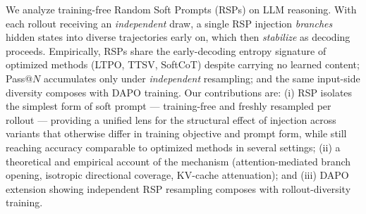 We analyze training-free Random Soft Prompts (RSPs) on LLM reasoning. With each rollout receiving an \emph{independent} draw, a single RSP injection \emph{branches} hidden states into diverse trajectories early on, which then \emph{stabilize} as decoding proceeds. Empirically, RSPs share the early-decoding entropy signature of optimized methods (LTPO, TTSV, SoftCoT) despite carrying no learned content; Pass@$N$ accumulates only under \emph{independent} resampling; and the same input-side diversity composes with DAPO \citep{yu2025dapo} training. Our contributions are: (i) RSP isolates the simplest form of soft prompt --- training-free and freshly resampled per rollout --- providing a unified lens for the structural effect of injection across variants that otherwise differ in training objective and prompt form, while still reaching accuracy comparable to optimized methods in several settings; (ii) a theoretical and empirical account of the mechanism (attention-mediated branch opening, isotropic directional coverage, KV-cache attenuation); and (iii) DAPO extension showing independent RSP resampling composes with rollout-diversity training.
